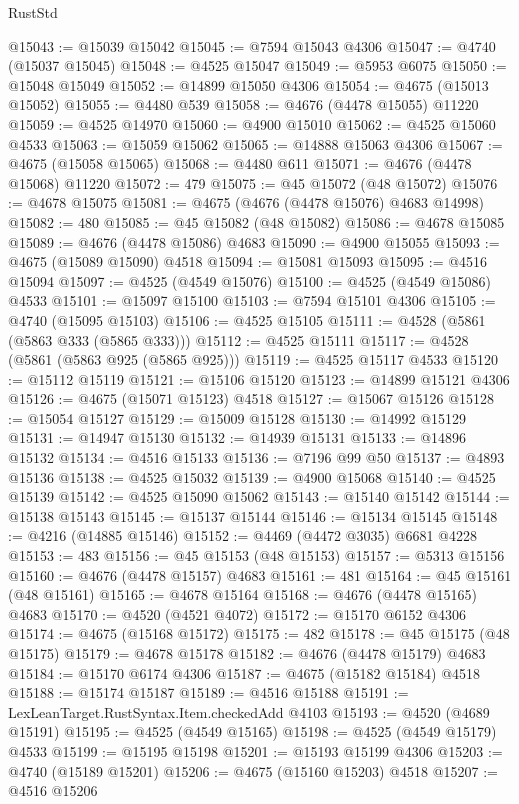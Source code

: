 \begin{lexlean}{RustStd}
\begin{coremodule}
{\begin{coremodule}
{{{{{{{{{{{{{{{{{{{{{{{{{{{{{{{{{{{{{{{{{{{{{{{{{{{{{{{{{{{{@15043 := @15039 @15042
@15045 := @7594 @15043 @4306
@15047 := @4740 (@15037 @15045)
@15048 := @4525 @15047
@15049 := @5953 @6075
@15050 := @15048 @15049
@15052 := @14899 @15050 @4306
@15054 := @4675 (@15013 @15052)
@15055 := @4480 @539
@15058 := @4676 (@4478 @15055) @11220
@15059 := @4525 @14970
@15060 := @4900 @15010
@15062 := @4525 @15060 @4533
@15063 := @15059 @15062
@15065 := @14888 @15063 @4306
@15067 := @4675 (@15058 @15065)
@15068 := @4480 @611
@15071 := @4676 (@4478 @15068) @11220
@15072 := 479
@15075 := @45 @15072 (@48 @15072)
@15076 := @4678 @15075
@15081 := @4675 (@4676 (@4478 @15076) @4683 @14998)
@15082 := 480
@15085 := @45 @15082 (@48 @15082)
@15086 := @4678 @15085
@15089 := @4676 (@4478 @15086) @4683
@15090 := @4900 @15055
@15093 := @4675 (@15089 @15090) @4518
@15094 := @15081 @15093
@15095 := @4516 @15094
@15097 := @4525 (@4549 @15076)
@15100 := @4525 (@4549 @15086) @4533
@15101 := @15097 @15100
@15103 := @7594 @15101 @4306
@15105 := @4740 (@15095 @15103)
@15106 := @4525 @15105
@15111 := @4528 (@5861 (@5863 @333 (@5865 @333)))
@15112 := @4525 @15111
@15117 := @4528 (@5861 (@5863 @925 (@5865 @925)))
@15119 := @4525 @15117 @4533
@15120 := @15112 @15119
@15121 := @15106 @15120
@15123 := @14899 @15121 @4306
@15126 := @4675 (@15071 @15123) @4518
@15127 := @15067 @15126
@15128 := @15054 @15127
@15129 := @15009 @15128
@15130 := @14992 @15129
@15131 := @14947 @15130
@15132 := @14939 @15131
@15133 := @14896 @15132
@15134 := @4516 @15133
@15136 := @7196 @99 @50
@15137 := @4893 @15136
@15138 := @4525 @15032
@15139 := @4900 @15068
@15140 := @4525 @15139
@15142 := @4525 @15090 @15062
@15143 := @15140 @15142
@15144 := @15138 @15143
@15145 := @15137 @15144
@15146 := @15134 @15145
@15148 := @4216 (@14885 @15146)
@15152 := @4469 (@4472 @3035) @6681 @4228
@15153 := 483
@15156 := @45 @15153 (@48 @15153)
@15157 := @5313 @15156
@15160 := @4676 (@4478 @15157) @4683
@15161 := 481
@15164 := @45 @15161 (@48 @15161)
@15165 := @4678 @15164
@15168 := @4676 (@4478 @15165) @4683
@15170 := @4520 (@4521 @4072)
@15172 := @15170 @6152 @4306
@15174 := @4675 (@15168 @15172)
@15175 := 482
@15178 := @45 @15175 (@48 @15175)
@15179 := @4678 @15178
@15182 := @4676 (@4478 @15179) @4683
@15184 := @15170 @6174 @4306
@15187 := @4675 (@15182 @15184) @4518
@15188 := @15174 @15187
@15189 := @4516 @15188
@15191 := LexLeanTarget.RustSyntax.Item.checkedAdd @4103
@15193 := @4520 (@4689 @15191)
@15195 := @4525 (@4549 @15165)
@15198 := @4525 (@4549 @15179) @4533
@15199 := @15195 @15198
@15201 := @15193 @15199 @4306
@15203 := @4740 (@15189 @15201)
@15206 := @4675 (@15160 @15203) @4518
@15207 := @4516 @15206
}}}}}}}}}}}}}}}}}}}}}}}}}}}}}}}}}}}}}}}}}}}}}}}}}}}}}}}}}}}}
\end{coremodule}}
\end{coremodule}
\end{lexlean}

